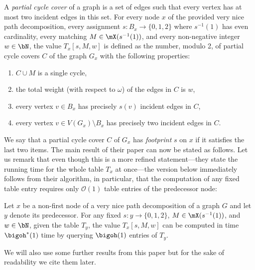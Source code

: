 \documentclass[a4paper,UKenglish,cleveref, autoref, thm-restate]{lipics-v2021}
\begin{document}
\begin{definition}\label{def:dp-table}
A \emph{partial cycle cover} of a graph is a set of edges such that every vertex has at most two incident edges in this set.
For every node $x$ of the provided very nice path decomposition, every assignment $s \colon B_x \to \{0, 1, 2\}$ where $s^{-1}(1)$ has even cardinality, every matching $M \in \mX(s^{-1}(1))$, and every non-negative integer $w \in \bN$, the value $T_x[s, M, w]$ is defined as the number, modulo 2, of partial cycle covers $C$ of the graph $G_x$ with the following properties:
\begin{enumerate}
	\item $C \cup M$ is a single cycle,
	\item the total weight (with respect to $\omega$) of the edges in $C$ is $w$,
	\item every vertex $v \in B_x$ has precisely $s(v)$ incident edges in $C$,
	\item every vertex $v \in V(G_x) \setminus B_x$ has precisely two incident edges in $C$.
\end{enumerate}
\end{definition}
We say that a partial cycle cover $C$ of $G_x$ has \emph{footprint} $s$ on $x$ if it satisfies the last two items.
The main result of their paper can now be stated as follows. 
Let us remark that even though this is a more refined statement---they state the running time for the whole table $T_x$ at once---the version below immediately follows from their algorithm, in particular, that the computation of any fixed table entry requires only $\mathcal{O}(1)$ table entries of the predecessor node:
\begin{theorem}\label{thm:single-entry-computation}
	Let $x$ be a non-first node of a very nice path decomposition of a graph $G$ and let $y$ denote its predecessor. 
	For any fixed $s \colon y \to \{0,1,2\}$, $M \in \mX(s^{-1}(1))$, and $w \in \bN$, given the table $T_y$, the value $T_x[s, M, w]$ can be computed in time $\bigoh^*(1)$ time by querying $\bigoh(1)$ entries of $T_y$.
\end{theorem}
We will also use some further results from this paper but for the sake of readability we cite them later. 
\end{document}
